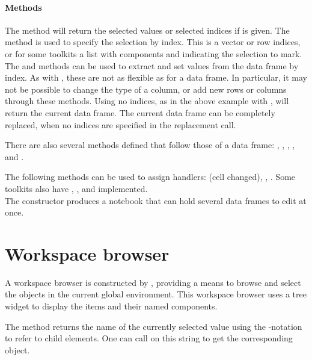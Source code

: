 \paragraph{Methods} The  method will return the
selected values or selected indices if  is given. The
 method is used to specify the selection by
index. This is a vector or row indices, or for some toolkits a list
with components  and  indicating the
selection to mark.  The \method{[}{gdf} and \method{[\ASSIGN}{gdf}
methods can be used to extract and set values from the data frame by
index. As with , these are not as flexible as for a data
frame. In particular, it may not be possible to change the type of a
column, or add new rows or columns through these methods. Using no
indices, as in the above example with , will return the
current data frame. The current data frame can be completely replaced,
when no indices are specified in the replacement call.

There are also several methods defined that follow those of a data
frame: , ,
, , and
.

The following methods can be used to assign handlers:
 (cell changed),
,
. Some toolkits also have
,
, and
 implemented.
\\


The  constructor produces a notebook that can
hold several data frames to edit at once.




\section{Workspace browser}
\label{sec:gWidgets-workspace-browser}

A workspace browser is constructed by , providing a
means to browse and select the objects in the current global
environment. This workspace browser uses a tree widget to display the
items and their named components.

The  method returns the name of the currently selected value
using the \code{\$}-notation to refer to child elements.  One can call
 on this string to get the corresponding \R\/ object.

